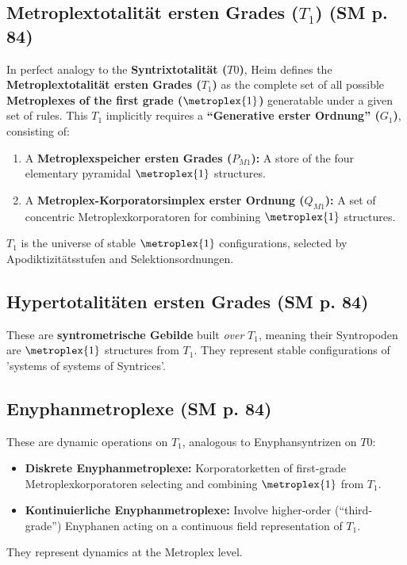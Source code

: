 \documentclass[
    12pt,              %
    a4paper,           %
    headings=normal,   %
    twoside=true,      %
    BCOR=8mm,          %
]{scrbook}
\newcommand{\q}[1]{\enquote{#1}}
\newcommand{\syntrixtotalitaet}{T0}
\newcommand{\hypersyntrix}{\metroplex{1}}
\newcommand{\metroplextotalitaet}[1]{T_{#1}}
\begin{document}
\subsection{Metroplextotalität ersten Grades (\(\metroplextotalitaet{1}\)) (SM p. 84)}
\label{sec:ch5_metroplextotalitaet1}
In perfect analogy to the \textbf{Syntrixtotalität (\(\syntrixtotalitaet\))}, Heim defines the \textbf{Metroplextotalität ersten Grades (\(\metroplextotalitaet{1}\))} as the complete set of all possible \textbf{Metroplexes of the first grade (\(\hypersyntrix\))} generatable under a given set of rules. This \(\metroplextotalitaet{1}\) implicitly requires a \textbf{\q{Generative erster Ordnung} (\(G_1\))}, consisting of:
\begin{enumerate}
    \item  A \textbf{Metroplexspeicher ersten Grades (\(P_{M1}\)):} A store of the four elementary pyramidal \(\hypersyntrix\) structures.
    \item  A \textbf{Metroplex-Korporatorsimplex erster Ordnung (\(Q_{M1}\)):} A set of concentric Metroplexkorporatoren for combining \(\hypersyntrix\) structures.
\end{enumerate}
\(\metroplextotalitaet{1}\) is the universe of stable \(\hypersyntrix\) configurations, selected by Apodiktizitätsstufen and Selektionsordnungen.

\subsection{Hypertotalitäten ersten Grades (SM p. 84)}
\label{sec:ch5_hypertotalitaeten1}
These are \textbf{syntrometrische Gebilde} built \textit{over} \(\metroplextotalitaet{1}\), meaning their Syntropoden are \(\hypersyntrix\) structures from \(\metroplextotalitaet{1}\). They represent stable configurations of 'systems of systems of Syntrices'.

\subsection{Enyphanmetroplexe (SM p. 84)}
\label{sec:ch5_enyphanmetroplexe}
These are dynamic operations on \(\metroplextotalitaet{1}\), analogous to Enyphansyntrizen on \(\syntrixtotalitaet\):
\begin{itemize}
    \item   \textbf{Diskrete Enyphanmetroplexe:} Korporatorketten of first-grade Metroplexkorporatoren selecting and combining \(\hypersyntrix\) from \(\metroplextotalitaet{1}\).
    \item   \textbf{Kontinuierliche Enyphanmetroplexe:} Involve higher-order (\q{third-grade}) Enyphanen acting on a continuous field representation of \(\metroplextotalitaet{1}\).
\end{itemize}
They represent dynamics at the Metroplex level.
\end{document}
